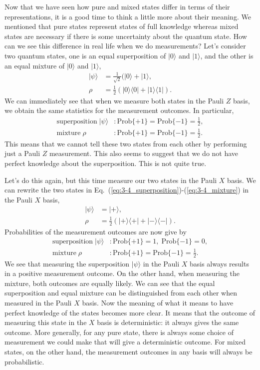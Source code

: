 Now that we have seen how pure and mixed states differ in terms of their representations, it is a good time to think a little more about their meaning.
We mentioned that pure states represent states of full knowledge whereas mixed states are necessary if there is some uncertainty about the quantum state.
How can we see this difference in real life when we do measurements?
Let's consider two quantum states, one is an equal superposition of $|0\rangle$ and $|1\rangle$, and the other is an equal mixture of $|0\rangle$ and $|1\rangle$,
\begin{align}
    |\psi\rangle & = \frac{1}{\sqrt{2}} (|0\rangle + |1\rangle, \label{eq:3-4_superposition}\\
    \rho & = \frac{1}{2} (|0\rangle\langle0| + |1\rangle\langle1|). \label{eq:3-4_mixture}
\end{align}
We can immediately see that when we measure both states in the Pauli $Z$ basis, we obtain the same statistics for the measurement outcomes.
In particular,
\begin{align}
    \text{superposition} \; |\psi\rangle & : \text{Prob}\{+1\} = \text{Prob}\{-1\} = \frac{1}{2},  \\
    \text{mixture} \; \rho & : \text{Prob}\{+1\} = \text{Prob}\{-1\} = \frac{1}{2}.
\end{align}
This means that we cannot tell these two states from each other by performing just a Pauli $Z$ measurement.
This also seems to suggest that we do not have perfect knowledge about the superposition. This is not quite true.

Let's do this again, but this time measure our two states in the Pauli $X$ basis.
We can rewrite the two states in Eq.~(\ref{eq:3-4_superposition})-(\ref{eq:3-4_mixture}) in the Pauli $X$ basis,
\begin{align}
    |\psi\rangle & = |+\rangle, \\
    \rho & = \frac{1}{2} (|+\rangle\langle+| + |-\rangle\langle-|).
\end{align}
Probabilities of the measurement outcomes are now give by
\begin{align}
    \text{superposition} \; |\psi\rangle & : \text{Prob}\{+1\} = 1, \; \text{Prob}\{-1\} = 0,  \\
    \text{mixture} \; \rho & : \text{Prob}\{+1\} = \text{Prob}\{-1\} = \frac{1}{2}.
\end{align}
We see that measuring the superposition $|\psi\rangle$ in the Pauli $X$ basis always results in a positive measurement outcome.
On the other hand, when measuring the mixture, both outcomes are equally likely.
We can see that the equal superposition and equal mixture can be distinguished from each other when measured in the Pauli $X$ basis.
Now the meaning of what it means to have perfect knowledge of the states becomes more clear.
It means that the outcome of measuring this state in the $X$ basis is deterministic: it always gives the same outcome. More generally, for any pure state, there is always some choice of measurement we could make that will give a deterministic outcome. For mixed states, on the other hand, the measurement outcomes in any basis will always be probabilistic.

